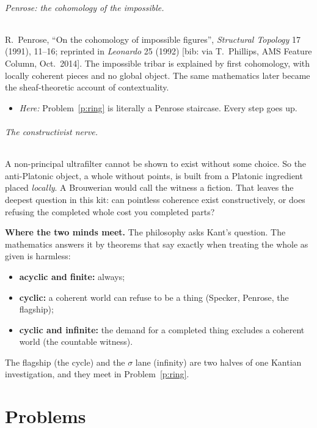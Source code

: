 \documentclass[11pt]{article}
\theoremstyle{definition}
\theoremstyle{remark}
\newcommand{\bp}[1]{\begin{mdframed}[backgroundcolor=black!4,linewidth=0.4pt]#1\end{mdframed}}
\begin{document}
\paragraph{Penrose: the cohomology of the impossible.}
R.~Penrose, ``On the cohomology of impossible figures'', \emph{Structural
Topology} 17 (1991), 11--16; reprinted in \emph{Leonardo} 25 (1992)
\textsf{[bib: via T.~Phillips, AMS Feature Column, Oct.\ 2014]}. The impossible
tribar is explained by first cohomology, with locally coherent pieces and no
global object. The same mathematics later became the sheaf-theoretic account of
contextuality.
\begin{itemize}[nosep]
  \item \emph{Here:} Problem~\ref{p:ring} is literally a Penrose staircase. Every
    step goes up.
\end{itemize}

\paragraph{The constructivist nerve.}
A non-principal ultrafilter cannot be shown to exist without some choice. So the
anti-Platonic object, a whole without points, is built from a Platonic
ingredient placed \emph{locally}. A Brouwerian would call the witness a fiction.
That leaves the deepest question in this kit: can pointless coherence exist
constructively, or does refusing the completed whole cost you completed parts?

\bp{\textbf{Where the two minds meet.} The philosophy asks Kant's question. The
mathematics answers it by theorems that say exactly when treating the whole as
given is harmless:
\begin{itemize}[nosep]
  \item \textbf{acyclic and finite:} always;
  \item \textbf{cyclic:} a coherent world can refuse to be a thing (Specker,
    Penrose, the flagship);
  \item \textbf{cyclic and infinite:} the demand for a completed thing excludes a
    coherent world (the countable witness).
\end{itemize}
The flagship (the cycle) and the $\sigma$ lane (infinity) are two halves of one
Kantian investigation, and they meet in Problem~\ref{p:ring}.}

\part{Problems}
\end{document}
